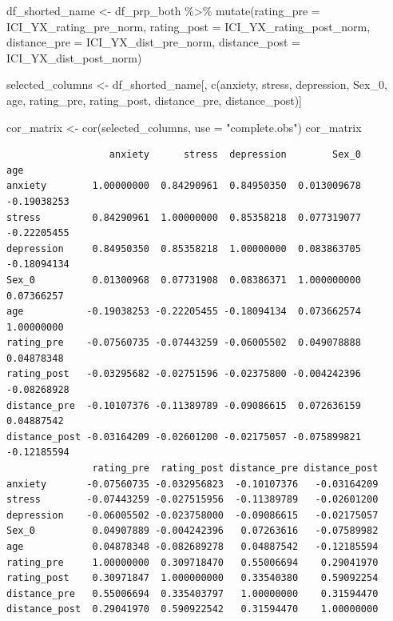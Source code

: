 \documentclass[
  letterpaper,
  DIV=11,
  numbers=noendperiod]{scrartcl}
\newenvironment{Shaded}{\begin{snugshade}}{\end{snugshade}}
\newcommand{\AttributeTok}[1]{\textcolor[rgb]{0.40,0.45,0.13}{#1}}
\newcommand{\FunctionTok}[1]{\textcolor[rgb]{0.28,0.35,0.67}{#1}}
\newcommand{\NormalTok}[1]{\textcolor[rgb]{0.00,0.23,0.31}{#1}}
\newcommand{\OtherTok}[1]{\textcolor[rgb]{0.00,0.23,0.31}{#1}}
\newcommand{\SpecialCharTok}[1]{\textcolor[rgb]{0.37,0.37,0.37}{#1}}
\newcommand{\StringTok}[1]{\textcolor[rgb]{0.13,0.47,0.30}{#1}}
\begin{document}
\begin{Shaded}
\begin{Highlighting}[]
\NormalTok{df\_shorted\_name }\OtherTok{\textless{}{-}}\NormalTok{ df\_prp\_both }\SpecialCharTok{\%\textgreater{}\%}
  \FunctionTok{mutate}\NormalTok{(}\AttributeTok{rating\_pre =}\NormalTok{ ICI\_YX\_rating\_pre\_norm,}
         \AttributeTok{rating\_post =}\NormalTok{ ICI\_YX\_rating\_post\_norm,}
         \AttributeTok{distance\_pre =}\NormalTok{ ICI\_YX\_dist\_pre\_norm,}
         \AttributeTok{distance\_post =}\NormalTok{ ICI\_YX\_dist\_post\_norm)}
  
\NormalTok{selected\_columns }\OtherTok{\textless{}{-}}\NormalTok{ df\_shorted\_name[, }\FunctionTok{c}\NormalTok{(}\StringTok{\textquotesingle{}anxiety\textquotesingle{}}\NormalTok{, }\StringTok{\textquotesingle{}stress\textquotesingle{}}\NormalTok{, }\StringTok{\textquotesingle{}depression\textquotesingle{}}\NormalTok{, }\StringTok{\textquotesingle{}Sex\_0\textquotesingle{}}\NormalTok{, }\StringTok{\textquotesingle{}age\textquotesingle{}}\NormalTok{, }\StringTok{\textquotesingle{}rating\_pre\textquotesingle{}}\NormalTok{, }\StringTok{\textquotesingle{}rating\_post\textquotesingle{}}\NormalTok{, }\StringTok{\textquotesingle{}distance\_pre\textquotesingle{}}\NormalTok{, }\StringTok{\textquotesingle{}distance\_post\textquotesingle{}}\NormalTok{)]}

\NormalTok{cor\_matrix }\OtherTok{\textless{}{-}} \FunctionTok{cor}\NormalTok{(selected\_columns, }\AttributeTok{use =} \StringTok{"complete.obs"}\NormalTok{)}
\NormalTok{cor\_matrix}
\end{Highlighting}
\end{Shaded}

\begin{verbatim}
                  anxiety      stress  depression        Sex_0         age
anxiety        1.00000000  0.84290961  0.84950350  0.013009678 -0.19038253
stress         0.84290961  1.00000000  0.85358218  0.077319077 -0.22205455
depression     0.84950350  0.85358218  1.00000000  0.083863705 -0.18094134
Sex_0          0.01300968  0.07731908  0.08386371  1.000000000  0.07366257
age           -0.19038253 -0.22205455 -0.18094134  0.073662574  1.00000000
rating_pre    -0.07560735 -0.07443259 -0.06005502  0.049078888  0.04878348
rating_post   -0.03295682 -0.02751596 -0.02375800 -0.004242396 -0.08268928
distance_pre  -0.10107376 -0.11389789 -0.09086615  0.072636159  0.04887542
distance_post -0.03164209 -0.02601200 -0.02175057 -0.075899821 -0.12185594
               rating_pre  rating_post distance_pre distance_post
anxiety       -0.07560735 -0.032956823  -0.10107376   -0.03164209
stress        -0.07443259 -0.027515956  -0.11389789   -0.02601200
depression    -0.06005502 -0.023758000  -0.09086615   -0.02175057
Sex_0          0.04907889 -0.004242396   0.07263616   -0.07589982
age            0.04878348 -0.082689278   0.04887542   -0.12185594
rating_pre     1.00000000  0.309718470   0.55006694    0.29041970
rating_post    0.30971847  1.000000000   0.33540380    0.59092254
distance_pre   0.55006694  0.335403797   1.00000000    0.31594470
distance_post  0.29041970  0.590922542   0.31594470    1.00000000
\end{verbatim}
\end{document}
